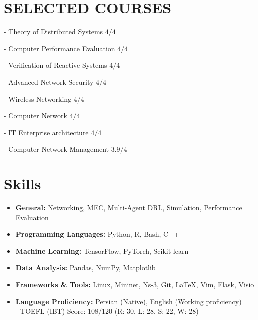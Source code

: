 \documentclass[11pt]{article}
\begin{document}
\newpage

\section{SELECTED COURSES}
		\vspace{-5mm}
	     \setlength\itemsep{0em}
	     \begin{multicols}{2}
				- Theory of Distributed Systems  \hfill $4/4$ 
				
			    -  Computer Performance Evaluation \hfill $4/4$
			    
			    - Verification of Reactive Systems  \hfill  $4/4$
			     
				 - Advanced Network Security  \hfill $4/4$
				 
		         - Wireless Networking  \hfill $4/4$
		         
		         - Computer Network  \hfill $4/4$
		         
		          - IT Enterprise architecture  \hfill  $4/4$
		         
		         - Computer Network Management  \hfill $3.9/4$
		         

		         
		     \end{multicols}


\section{Skills}



\begin{itemize}[noitemsep,topsep=0pt,parsep=0pt,partopsep=0pt]
	\item {\textbf{General:} Networking, MEC, Multi-Agent DRL, Simulation, Performance Evaluation}\vspace{1mm}
	\item {\textbf{Programming Languages:} Python, R, Bash, C++}\vspace{1mm}
	\item {\textbf{Machine Learning:} TensorFlow, PyTorch, Scikit-learn}\vspace{1mm}
	\item {\textbf{Data Analysis:} Pandas, NumPy, Matplotlib}\vspace{1mm}
	\item {\textbf{Frameworks \& Tools:} Linux, Mininet, Ns-3, Git, \LaTeX, Vim, Flask, Visio}\vspace{1mm}
	\item {\textbf{Language Proficiency:} Persian (Native), English (Working proficiency)}\vspace{1mm}\\
	- TOEFL (IBT) Score: 108/120 (R: 30, L: 28, S: 22, W: 28)


\end{itemize}
\end{document}

